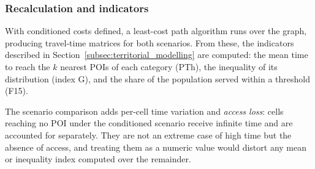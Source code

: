 \subsubsection{Recalculation and indicators}

With conditioned costs defined, a least-cost path algorithm runs over the graph, producing travel-time matrices for both scenarios. From these, the indicators described in Section~\ref{subsec:territorial_modelling} are computed: the mean time to reach the $k$ nearest POIs of each category (PTh), the inequality of its distribution (index G), and the share of the population served within a threshold (F15).

The scenario comparison adds per-cell time variation and \emph{access loss}: cells reaching no POI under the conditioned scenario receive infinite time and are accounted for separately. They are not an extreme case of high time but the absence of access, and treating them as a numeric value would distort any mean or inequality index computed over the remainder.
